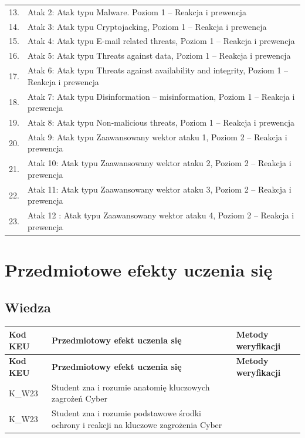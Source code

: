 \documentclass[12pt, a4paper]{article}
\newcommand{\thdrule}{\noalign{\global\setlength{\extrarowheight}{0pt}}}
\newcommand{\thdend}{\noalign{\global\setlength{\extrarowheight}{3pt}}}
\begin{document}
{\begin{longtable}{m{1.5cm}m{14.5cm}}
  \rowcolor{tableRowLight} 13. & Atak 2: Atak typu Malware. Poziom 1 – Reakcja i prewencja \\
  \rowcolor{tableRowAlt} 14. & Atak 3: Atak typu Cryptojacking, Poziom 1 – Reakcja i prewencja \\
  \rowcolor{tableRowLight} 15. & Atak 4: Atak typu E-mail related threats, Poziom 1 – Reakcja i prewencja \\
  \rowcolor{tableRowAlt} 16. & Atak 5: Atak typu Threats against data, Poziom 1 – Reakcja i prewencja \\
  \rowcolor{tableRowLight} 17. & Atak 6: Atak typu Threats against availability and integrity, Poziom 1 – Reakcja i prewencja \\
  \rowcolor{tableRowAlt} 18. & Atak 7: Atak typu Disinformation – misinformation, Poziom 1 – Reakcja i prewencja \\
  \rowcolor{tableRowLight} 19. & Atak 8: Atak typu Non-malicious threats, Poziom 1 – Reakcja i prewencja \\
  \rowcolor{tableRowAlt} 20. & Atak 9: Atak typu Zaawansowany wektor ataku 1, Poziom 2  – Reakcja i prewencja \\
  \rowcolor{tableRowLight} 21. & Atak 10: Atak typu Zaawansowany wektor ataku 2, Poziom 2  – Reakcja i prewencja \\
  \rowcolor{tableRowAlt} 22. & Atak 11: Atak typu Zaawansowany wektor ataku 3, Poziom 2  – Reakcja i prewencja \\
  \rowcolor{tableRowLight} 23. & Atak 12 : Atak typu Zaawansowany wektor ataku 4, Poziom 2  – Reakcja i prewencja \\
\bottomrule
\end{longtable}}

\section{Przedmiotowe efekty uczenia się}

\subsection*{Wiedza}
{\scriptsize
\begin{longtable}{m{1.6cm}m{9.0cm}m{4.2cm}}
\thdrule\toprule
\rowcolor{pjatkRed} {\color{white}\footnotesize\textbf{\vphantom{Ag}Kod KEU}} & {\color{white}\footnotesize\textbf{\vphantom{Ag}Przedmiotowy efekt uczenia się}} & {\color{white}\footnotesize\textbf{\vphantom{Ag}Metody weryfikacji}} \\
\midrule\thdend
\endfirsthead
\thdrule\toprule
\rowcolor{pjatkRed} {\color{white}\footnotesize\textbf{\vphantom{Ag}Kod KEU}} & {\color{white}\footnotesize\textbf{\vphantom{Ag}Przedmiotowy efekt uczenia się}} & {\color{white}\footnotesize\textbf{\vphantom{Ag}Metody weryfikacji}} \\
\midrule\thdend
\endhead
  \rowcolor{tableRowLight} K\_W23 & Student zna i rozumie anatomię kluczowych zagrożeń Cyber &  \\
  \rowcolor{tableRowAlt} K\_W23 & Student zna i rozumie podstawowe środki ochrony i reakcji na kluczowe zagrożenia Cyber &  \\
\bottomrule
\end{longtable}}
\end{document}
